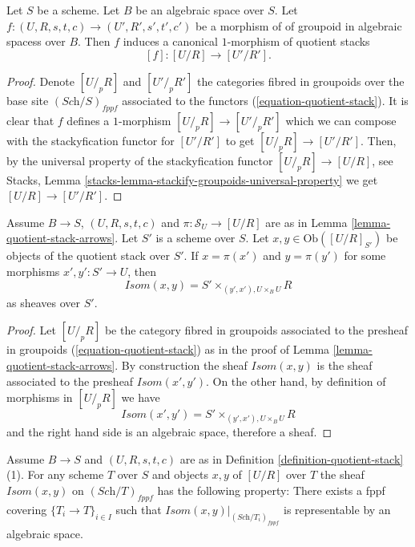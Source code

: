 \begin{lemma}
\label{lemma-quotient-stack-functorial}
Let $S$ be a scheme. Let $B$ be an algebraic space over $S$.
Let $f : (U, R, s, t, c) \to (U', R', s', t', c')$ be a morphism of
of groupoid in algebraic spacess over $B$.
Then $f$ induces a canonical $1$-morphism of quotient stacks
$$
[f] : [U/R] \longrightarrow [U'/R'].
$$
\end{lemma}

\begin{proof}
Denote $[U/_{\!p}R]$ and $[U'/_{\!p}R']$ the categories fibred
in groupoids over the base site $(\textit{Sch}/S)_{fppf}$ associated to the
functors (\ref{equation-quotient-stack}). It is clear that $f$ defines
a $1$-morphism $[U/_{\!p}R] \to [U'/_{\!p}R']$ which we can compose
with the stackyfication functor for $[U'/R']$ to get $[U/_{\!p}R] \to [U'/R']$.
Then, by the universal property of the stackyfication functor
$[U/_{\!p}R] \to [U/R]$, see
Stacks, Lemma \ref{stacks-lemma-stackify-groupoids-universal-property}
we get $[U/R] \to [U'/R']$.
\end{proof}

\begin{lemma}
\label{lemma-quotient-stack-morphisms}
Assume $B \to S$, $(U, R, s, t, c)$ and $\pi : \mathcal{S}_U \to [U/R]$
are as in
Lemma \ref{lemma-quotient-stack-arrows}.
Let $S'$ is a scheme over $S$.
Let $x, y \in \text{Ob}([U/R]_{S'})$ be objects of the
quotient stack over $S'$. If $x = \pi(x')$ and $y = \pi(y')$ for
some morphisms $x', y' : S' \to U$, then
$$
\mathit{Isom}(x, y) = S' \times_{(y', x'), U \times_B U} R
$$
as sheaves over $S'$.
\end{lemma}

\begin{proof}
Let $[U/_{\!p}R]$ be the category fibred in groupoids associated to
the presheaf in groupoids (\ref{equation-quotient-stack}) as in the proof of
Lemma \ref{lemma-quotient-stack-arrows}.
By construction the sheaf $\mathit{Isom}(x, y)$ is the sheaf associated
to the presheaf $\mathit{Isom}(x', y')$. On the other hand, by definition
of morphisms in $[U/_{\!p}R]$ we have
$$
\mathit{Isom}(x', y') = S' \times_{(y', x'), U \times_B U} R
$$
and the right hand side is an algebraic space, therefore a sheaf.
\end{proof}

\begin{lemma}
\label{lemma-quotient-stack-isom}
Assume $B \to S$ and $(U, R, s, t, c)$ are as in
Definition \ref{definition-quotient-stack} (1).
For any scheme $T$ over $S$ and objects $x, y$ of $[U/R]$ over $T$
the sheaf $\mathit{Isom}(x, y)$ on $(\textit{Sch}/T)_{fppf}$ has
the following property: There exists a fppf covering
$\{T_i \to T\}_{i \in I}$ such that
$\mathit{Isom}(x, y)|_{(\textit{Sch}/T_i)_{fppf}}$
is representable by an algebraic space.
\end{lemma}


